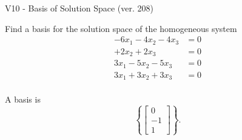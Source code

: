 \begin{exercise}
  \begin{exerciseTitle}V10 - Basis of Solution Space (ver. 208)\end{exerciseTitle}
  \begin{exerciseStatement}
    Find a basis for the solution space of the homogeneous system 
\begin{align*}
 -6 x_ 1 -4 x_ 2 -4 x_ 3 &= 0  \\ 
  + 2 x_ 2 + 2 x_ 3 &= 0  \\ 
  3 x_ 1 -5 x_ 2 -5 x_ 3 &= 0  \\ 
  3 x_ 1 + 3 x_ 2 + 3 x_ 3 &= 0  \\ 
 \end{align*}


 
  \end{exerciseStatement}

  \begin{exerciseAnswer}
   A basis is   
\[\left\{\left[\begin{array}{c}
0 \\
-1 \\
1
\end{array}\right]\right\}.\]

  


  \end{exerciseAnswer}
\end{exercise}